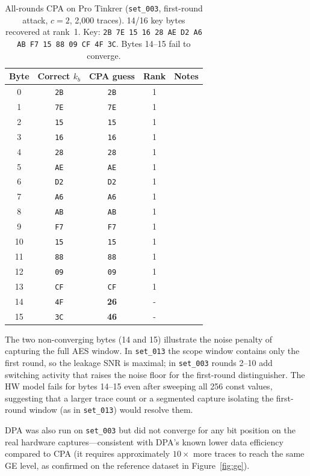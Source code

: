 \begin{table}[H]
\centering
\caption{All-rounds CPA on Pro Tinkrer (\texttt{set\_003}, first-round attack,
         $c=2$, 2{,}000 traces).
         14/16 key bytes recovered at rank~1.
         Key: \texttt{2B 7E 15 16 28 AE D2 A6 AB F7 15 88 09 CF 4F 3C}.
         Bytes 14--15 fail to converge.}
\label{tab:trinket_allrounds_cpa}
\begin{tabular}{@{}ccccc@{}}
\toprule
Byte & Correct $k_{b}$ & CPA guess & Rank & Notes \\
\midrule
 0  & \texttt{2B} & \texttt{2B} & 1 & \\
 1  & \texttt{7E} & \texttt{7E} & 1 & \\
 2  & \texttt{15} & \texttt{15} & 1 & \\
 3  & \texttt{16} & \texttt{16} & 1 & \\
 4  & \texttt{28} & \texttt{28} & 1 & \\
 5  & \texttt{AE} & \texttt{AE} & 1 & \\
 6  & \texttt{D2} & \texttt{D2} & 1 & \\
 7  & \texttt{A6} & \texttt{A6} & 1 & \\
 8  & \texttt{AB} & \texttt{AB} & 1 & \\
 9  & \texttt{F7} & \texttt{F7} & 1 & \\
10  & \texttt{15} & \texttt{15} & 1 & \\
11  & \texttt{88} & \texttt{88} & 1 & \\
12  & \texttt{09} & \texttt{09} & 1 & \\
13  & \texttt{CF} & \texttt{CF} & 1 & \\
14  & \texttt{4F} & \textbf{26} & - \\
15  & \texttt{3C} & \textbf{46} & - \\
\bottomrule
\end{tabular}
\end{table}

The two non-converging bytes (14 and 15) illustrate the noise penalty of
capturing the full AES window.
In \texttt{set\_013} the scope window contains only the first round, so the
leakage SNR is maximal; in \texttt{set\_003} rounds 2--10 add switching
activity that raises the noise floor for the first-round distinguisher.
The HW model fails for bytes 14--15 even after sweeping all 256 const values,
suggesting that a larger trace count or a segmented capture isolating the
first-round window (as in \texttt{set\_013}) would resolve them.

DPA was also run on \texttt{set\_003} but did not converge for any bit
position on the real hardware captures---consistent with DPA's known
lower data efficiency compared to CPA (it requires approximately $10\times$
more traces to reach the same GE level, as confirmed on the reference
dataset in Figure~\ref{fig:ge}).


